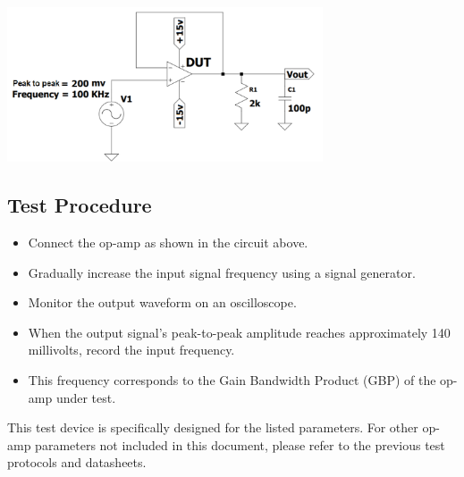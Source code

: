 \documentclass[a4paper,12pt]{article}
\begin{document}
\begin{center}
  \includegraphics[width=0.7\textwidth]{IMAGEs/gbp_test_device.png}
\end{center}

\subsection*{Test Procedure}

\begin{itemize}
  \item Connect the op-amp as shown in the circuit above.
  \item Gradually increase the input signal frequency using a signal generator.
  \item Monitor the output waveform on an oscilloscope.
  \item When the output signal’s peak-to-peak amplitude reaches approximately 140 millivolts, record the input frequency.
  \item This frequency corresponds to the Gain Bandwidth Product (GBP) of the op-amp under test.
\end{itemize}

\begin{tcolorbox}[colback=yellow!5!white, colframe=yellow!80!black, title=Note]
This test device is specifically designed for the listed parameters. For other op-amp parameters not included in this document, please refer to the previous test protocols and datasheets.
\end{tcolorbox}
\end{document}
